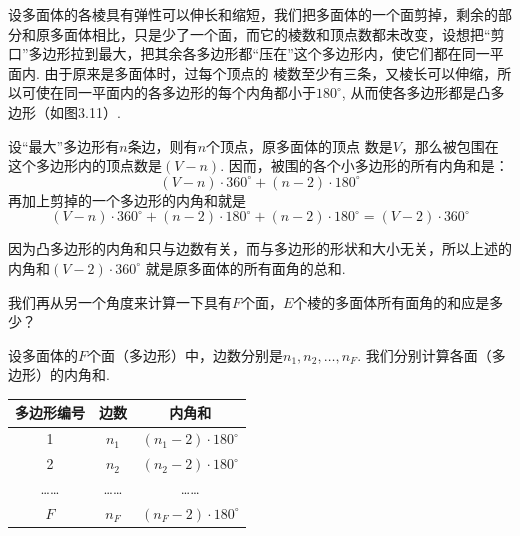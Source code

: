 \noindent
\begin{minipage}{0.65\textwidth}
  \CTEXindent 设多面体的各棱具有弹性可以伸长和缩短，我们把多面体的一个面剪掉，剩余的部分和原多面体相比，只是少了一个面，而它的棱数和顶点数都未改变，设想把“剪口”多边形拉到最大，把其余各多边形都“压在”这个多边形内，使它们都在同一平面内. 由于原来是多面体时，过每个顶点的
棱数至少有三条，又棱长可以伸缩，所以可使在同一平面内的各多边形的每个内角都小于$180^{\circ}$, 从而使各多边形都是凸多边形（如图3.11）.
\end{minipage}
\hfill
\begin{minipage}{0.3\textwidth}
  \centering
{}
\end{minipage}


设“最大”多边形有$n$条边，则有$n$个顶点，原多面体的顶点
数是$V$，那么被包围在这个多边形内的顶点数是$(V-n)$. 因而，被围的各个小多边形的所有内角和是：
\[
(V-n)\cdot  360^{\circ}+(n-2)\cdot  180^{\circ}\]
再加上剪掉的一个多边形的内角和就是
\[
(V-n)\cdot  360^{\circ}+(n-2)\cdot  180^{\circ}+(n-2)\cdot  180^{\circ}
=(V-2)\cdot  360^{\circ}\tag{1}\]

因为凸多边形的内角和只与边数有关，而与多边形的形状和大小无关，所以上述的内角和$(V-2)\cdot  360^{\circ}$ 就是原多面体的所有面角的总和.

我们再从另一个角度来计算一下具有$F$个面，$E$个棱的多面体所有面角的和应是多少？

设多面体的$F$个面（多边形）中，边数分别是$n_{1},n_{2},\ldots,n_F$. 我们分别计算各面（多边形）的内角和.

\begin{center}
\begin{tabular}{ccc}
\hline
多边形编号&	边数	&内角和\\
\hline
1	&$n_{1}$	&$\left(n_{1}-2\right)\cdot  180^{\circ}$\\
2	&$n_{2}$	&$\left(n_{2}-2\right)\cdot  180^{\circ}$\\
……	&……&	……\\
$F$	&$n_{F}$&	$\left(n_{F}-2\right)\cdot  180^{\circ}$\\
\hline
\end{tabular}
\end{center}

